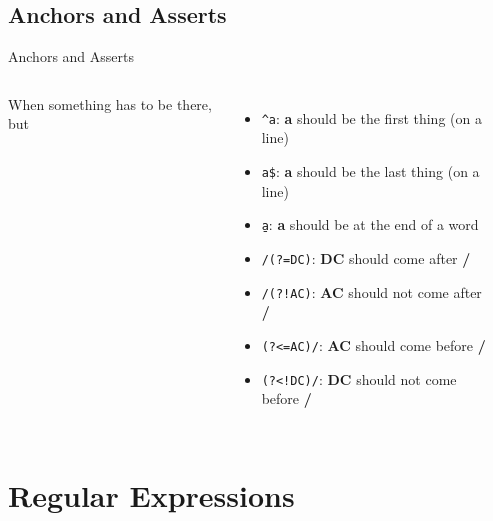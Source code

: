 \documentclass[english,aspectratio=169]{beamer}
\begin{document}
\subsection{Anchors and Asserts}
\begin{frame}{Anchors and Asserts}
\begin{columns}
        When something has to be there, but \textellipsis
        \begin{itemize}
            \item \texttt{\string^a}: \textbf{a} should be the first thing (on a line)
            \item \texttt{a\$}: \textbf{a} should be the last thing (on a line)
            \item \texttt{a\string\b}: \textbf{a} should be at the end of a word\textdagger{}
            \item \texttt{/(?=DC)}: \textbf{DC} should come after \textbf{/}
            \item \texttt{/(?!AC)}: \textbf{AC} should not come after \textbf{/}
            \item \texttt{(?<=AC)/}: \textbf{AC} should come before \textbf{/}
            \item \texttt{(?<!DC)/}: \textbf{DC} should not come before \textbf{/}
        \end{itemize}
        \begin{center}
        \end{center}
\end{columns}
\end{frame}

\section{Regular Expressions}
\end{document}

